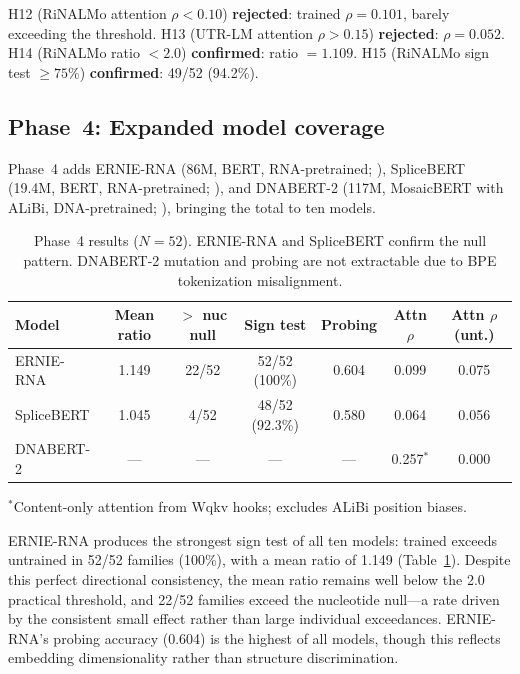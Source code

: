 \documentclass[11pt]{article}
\begin{document}
H12 (RiNALMo attention $\rho < 0.10$) \textbf{rejected}: trained
$\rho = 0.101$, barely exceeding the threshold.  H13 (UTR-LM
attention $\rho > 0.15$) \textbf{rejected}: $\rho = 0.052$.  H14
(RiNALMo ratio $< 2.0$) \textbf{confirmed}: ratio $= 1.109$.  H15
(RiNALMo sign test $\geq 75\%$) \textbf{confirmed}: 49/52 (94.2\%).

\subsection{Phase~4: Expanded model coverage}
\label{sec:phase4}

Phase~4 adds ERNIE-RNA (86M, BERT, RNA-pretrained;
\citealp{wang2024ernierna}), SpliceBERT (19.4M, BERT,
RNA-pretrained; \citealp{chen2024splicebert}), and DNABERT-2 (117M,
MosaicBERT with ALiBi, DNA-pretrained; \citealp{zhou2024dnabert2}),
bringing the total to ten models.

\begin{table}[t]
\centering
\caption{Phase~4 results ($N = 52$).  ERNIE-RNA and SpliceBERT
  confirm the null pattern.  DNABERT-2 mutation and probing are not
  extractable due to BPE tokenization misalignment.}
\label{tab:phase4}
\begin{tabular}{@{}lcccccc@{}}
\toprule
\textbf{Model} & \textbf{Mean ratio} & \textbf{$>$ nuc null} &
  \textbf{Sign test} & \textbf{Probing} &
  \textbf{Attn $\rho$} & \textbf{Attn $\rho$ (unt.)} \\
\midrule
ERNIE-RNA  & 1.149 & 22/52 & 52/52 (100\%) & 0.604 & 0.099 & 0.075 \\
SpliceBERT & 1.045 & 4/52  & 48/52 (92.3\%) & 0.580 & 0.064 & 0.056 \\
DNABERT-2  & ---   & ---   & ---            & ---   & 0.257$^*$ & 0.000 \\
\bottomrule
\end{tabular}
\medskip

\small $^*$Content-only attention from Wqkv hooks; excludes ALiBi
position biases.
\end{table}

ERNIE-RNA produces the strongest sign test of all ten models: trained
exceeds untrained in 52/52 families (100\%), with a mean ratio of
1.149 (Table~\ref{tab:phase4}).  Despite this perfect directional
consistency, the mean ratio remains well below the 2.0 practical
threshold, and 22/52 families exceed the nucleotide null---a rate
driven by the consistent small effect rather than large individual
exceedances.  ERNIE-RNA's probing accuracy (0.604) is the highest of
all models, though this reflects embedding dimensionality rather than
structure discrimination.
\end{document}
